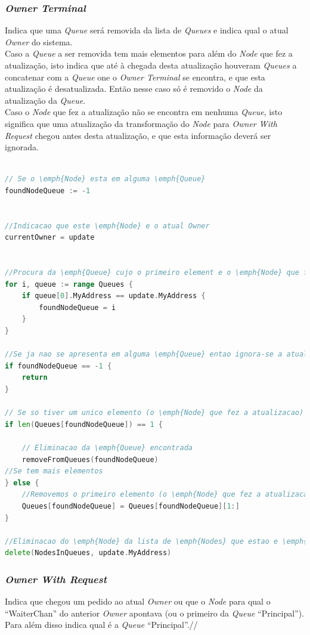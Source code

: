 \subsubsection*{\emph{Owner Terminal}}
Indica que uma \emph{Queue} será removida da lista de \emph{Queues} e indica qual o atual \emph{Owner} do sistema.\\
Caso a \emph{Queue} a ser removida tem mais elementos para além do \emph{Node} que fez a atualização, isto indica que até à chegada desta atualização houveram \emph{Queues} a concatenar com a \emph{Queue} one o \emph{Owner Terminal} se encontra, e que esta atualização é desatualizada. Então nesse caso só é removido o \emph{Node} da atualização da \emph{Queue}.\\
Caso o \emph{Node} que fez a atualização não se encontra em nenhuma \emph{Queue}, isto significa que uma atualização da transformação do \emph{Node} para \emph{Owner With Request} chegou antes desta atualização, e que esta informação deverá ser ignorada.

\begin{lstlisting}[caption={Alterações nas filas caso o \emph{Node} seja do tipo ``Owner Terminal''},language=Go]

// Se o \emph{Node} esta em alguma \emph{Queue}
foundNodeQueue := -1


//Indicacao que este \emph{Node} e o atual Owner
currentOwner = update


//Procura da \emph{Queue} cujo o primeiro element e o \emph{Node} que fez a atualizacao
for i, queue := range Queues {
	if queue[0].MyAddress == update.MyAddress {
		foundNodeQueue = i
	}
}

//Se ja nao se apresenta em alguma \emph{Queue} entao ignora-se a atualizacao
if foundNodeQueue == -1 {
	return
}

// Se so tiver um unico elemento (o \emph{Node} que fez a atualizacao) 
if len(Queues[foundNodeQueue]) == 1 {

	// Eliminacao da \emph{Queue} encontrada
	removeFromQueues(foundNodeQueue)
//Se tem mais elementos
} else {
	//Removemos o primeiro elemento (o \emph{Node} que fez a atualizacao)
	Queues[foundNodeQueue] = Queues[foundNodeQueue][1:]
}

//Eliminacao do \emph{Node} da lista de \emph{Nodes} que estao e \emph{Queues}
delete(NodesInQueues, update.MyAddress)


\end{lstlisting}


\subsubsection*{\emph{Owner With Request}}
Indica que chegou um pedido ao atual \emph{Owner} ou que o \emph{Node} para qual o ``WaiterChan'' do anterior \emph{Owner} apontava (ou o primeiro da \emph{Queue} ``Principal'').
Para além disso indica qual é a \emph{Queue} ``Principal''.//

